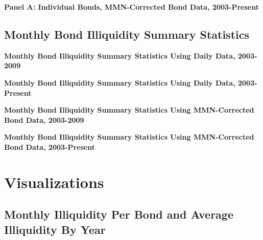 \documentclass{article}
\newcommand*{\PathToOutput}{../output/}%
\begin{document}
\begin{table}[hbt!]
\centering
\textbf{\large Panel A: Individual Bonds, MMN-Corrected Bond Data, 2003-Present}
\resizebox{\textwidth}{!}{%
    
}
\label{table:table2_panelA_daily_mmn_new}
\end{table}


\subsection{Monthly Bond Illiquidity Summary Statistics}

\begin{table}[hbt!]
\centering
\textbf{\large Monthly Bond Illiquidity Summary Statistics Using Daily Data, 2003-2009}

\label{table:illiq_summary_paper}
\end{table}


\begin{table}[hbt!]
\centering
\textbf{\large Monthly Bond Illiquidity Summary Statistics Using Daily Data, 2003-Present}
\resizebox{\textwidth}{!}{%
    
}
\label{table: illiq_summary_new}
\end{table}


\begin{table}[hbt!]
\centering
\textbf{\large Monthly Bond Illiquidity Summary Statistics Using MMN-Corrected Bond Data, 2003-2009}

\label{table:illiq_daily_summary_mmn_paper}
\end{table}


\begin{table}[hbt!]
\centering
\textbf{\large Monthly Bond Illiquidity Summary Statistics Using MMN-Corrected Bond Data, 2003-Present}
\resizebox{\textwidth}{!}{%
    
}
\label{table: illiq_daily_summary_mmn_new}
\end{table}


\section{Visualizations}

\subsection{Monthly Illiquidity Per Bond and Average Illiquidity By Year}
\end{document}
